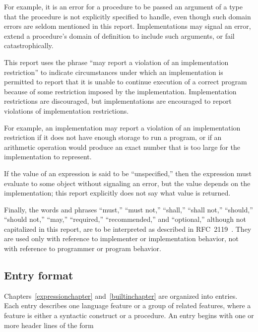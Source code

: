 For example, it is an error for a procedure to be passed an argument of a type that
the procedure is not explicitly specified to handle, even though such
domain errors are seldom mentioned in this report.  Implementations may
signal an error,
extend a procedure's domain of definition to include such arguments,
or fail catastrophically.

\vest This report uses the phrase ``may report a violation of an
implementation restriction'' to indicate circumstances under which an
implementation is permitted to report that it is unable to continue
execution of a correct program because of some restriction imposed by the
implementation.  Implementation restrictions are discouraged,
but implementations are encouraged to report violations of implementation
restrictions.

\vest For example, an implementation may report a violation of an
implementation restriction if it does not have enough storage to run a
program,
or if an arithmetic operation would produce an exact number that is
too large for the implementation to represent.

\vest If the value of an expression is said to be ``unspecified,'' then
the expression must evaluate to some object without signaling an error,
but the value depends on the implementation; this report explicitly does
not say what value is returned. 

\vest Finally, the words and phrases ``must,'' ``must not,'' ``shall,''
``shall not,'' ``should,'' ``should not,'' ``may,'' ``required,''
``recommended,'' and ``optional,'' although not capitalized in this
report, are to be interpreted as described in RFC~2119~\cite{rfc2119}.
They are used only with reference to implementer or implementation behavior,
not with reference to programmer or program behavior.



\subsection{Entry format}

Chapters~\ref{expressionchapter} and~\ref{builtinchapter} are organized
into entries.  Each entry describes one language feature or a group of
related features, where a feature is either a syntactic construct or a
procedure.  An entry begins with one or more header lines of the form

\noindent{}\unpenalty

